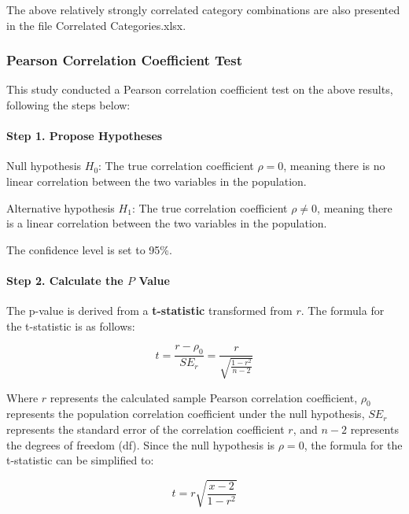\documentclass{article}
\begin{document}
	The above relatively strongly correlated category combinations are also presented in the file Correlated Categories.xlsx.
	
	\subsubsection{Pearson Correlation Coefficient Test}
	
	This study conducted a Pearson correlation coefficient test on the above results, following the steps below:
	
	\paragraph{Step 1. Propose Hypotheses}
	
	Null hypothesis $H_0$: The true correlation coefficient $\rho = 0$, meaning there is no linear correlation between the two variables in the population.
	
	Alternative hypothesis $H_1$: The true correlation coefficient $\rho \neq 0$, meaning there is a linear correlation between the two variables in the population.
	
	The confidence level is set to 95\%.
	
	\paragraph{Step 2. Calculate the $P$ Value}
	
	The p-value is derived from a \textbf{t-statistic} transformed from $r$. The formula for the t-statistic is as follows:
	
	\begin{equation}
		t = \frac{r - \rho_0}{SE_r} = \frac{r}{\sqrt{\frac{1-r^2}{n-2}}}
		\label{eq:t_test_correlation}
	\end{equation}
	
	Where $r$ represents the calculated sample Pearson correlation coefficient, $\rho_0$ represents the population correlation coefficient under the null hypothesis, $SE_r$ represents the standard error of the correlation coefficient $r$, and $n-2$ represents the degrees of freedom (df). Since the null hypothesis is $\rho = 0$, the formula for the t-statistic can be simplified to:
	
	\begin{equation}
		t = r \sqrt{\frac{x-2}{1-r^2}}
		\label{eq:t_test_simplified}
	\end{equation}
	
\end{document}
